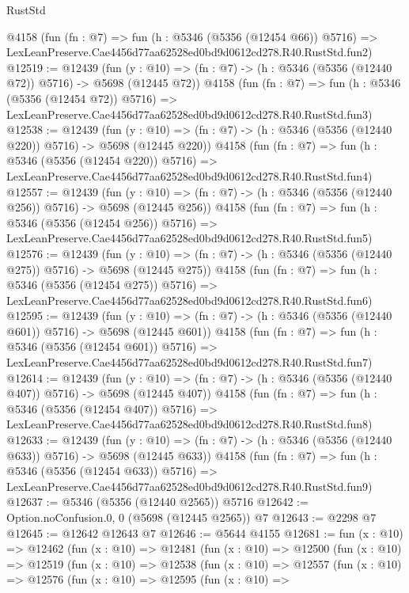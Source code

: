\begin{lexlean}{RustStd}
\begin{coremodule}
    @4158
    (fun (fn : @7) =>
    fun (h : @5346 (@5356 (@12454 @66)) @5716) =>
    LexLeanPreserve.Cae4456d77aa62528ed0bd9d0612cd278.R40.RustStd.fun2)
@12519 := @12439
    (fun (y : @10) => (fn : @7) -> (h : @5346 (@5356 (@12440 @72)) @5716) -> @5698 (@12445 @72))
    @4158
    (fun (fn : @7) =>
    fun (h : @5346 (@5356 (@12454 @72)) @5716) =>
    LexLeanPreserve.Cae4456d77aa62528ed0bd9d0612cd278.R40.RustStd.fun3)
@12538 := @12439
    (fun (y : @10) => (fn : @7) -> (h : @5346 (@5356 (@12440 @220)) @5716) -> @5698 (@12445 @220))
    @4158
    (fun (fn : @7) =>
    fun (h : @5346 (@5356 (@12454 @220)) @5716) =>
    LexLeanPreserve.Cae4456d77aa62528ed0bd9d0612cd278.R40.RustStd.fun4)
@12557 := @12439
    (fun (y : @10) => (fn : @7) -> (h : @5346 (@5356 (@12440 @256)) @5716) -> @5698 (@12445 @256))
    @4158
    (fun (fn : @7) =>
    fun (h : @5346 (@5356 (@12454 @256)) @5716) =>
    LexLeanPreserve.Cae4456d77aa62528ed0bd9d0612cd278.R40.RustStd.fun5)
@12576 := @12439
    (fun (y : @10) => (fn : @7) -> (h : @5346 (@5356 (@12440 @275)) @5716) -> @5698 (@12445 @275))
    @4158
    (fun (fn : @7) =>
    fun (h : @5346 (@5356 (@12454 @275)) @5716) =>
    LexLeanPreserve.Cae4456d77aa62528ed0bd9d0612cd278.R40.RustStd.fun6)
@12595 := @12439
    (fun (y : @10) => (fn : @7) -> (h : @5346 (@5356 (@12440 @601)) @5716) -> @5698 (@12445 @601))
    @4158
    (fun (fn : @7) =>
    fun (h : @5346 (@5356 (@12454 @601)) @5716) =>
    LexLeanPreserve.Cae4456d77aa62528ed0bd9d0612cd278.R40.RustStd.fun7)
@12614 := @12439
    (fun (y : @10) => (fn : @7) -> (h : @5346 (@5356 (@12440 @407)) @5716) -> @5698 (@12445 @407))
    @4158
    (fun (fn : @7) =>
    fun (h : @5346 (@5356 (@12454 @407)) @5716) =>
    LexLeanPreserve.Cae4456d77aa62528ed0bd9d0612cd278.R40.RustStd.fun8)
@12633 := @12439
    (fun (y : @10) => (fn : @7) -> (h : @5346 (@5356 (@12440 @633)) @5716) -> @5698 (@12445 @633))
    @4158
    (fun (fn : @7) =>
    fun (h : @5346 (@5356 (@12454 @633)) @5716) =>
    LexLeanPreserve.Cae4456d77aa62528ed0bd9d0612cd278.R40.RustStd.fun9)
@12637 := @5346 (@5356 (@12440 @2565)) @5716
@12642 := Option.noConfusion.{0, 0} (@5698 (@12445 @2565)) @7
@12643 := @2298 @7
@12645 := @12642 @12643 @7
@12646 := @5644 @4155
@12681 := fun (x : @10) =>
  @12462
    (fun (x : @10) =>
    @12481
      (fun (x : @10) =>
      @12500
        (fun (x : @10) =>
        @12519
          (fun (x : @10) =>
          @12538
            (fun (x : @10) =>
            @12557
              (fun (x : @10) =>
              @12576
                (fun (x : @10) =>
                @12595
                  (fun (x : @10) =>

\end{coremodule}
\end{lexlean}
